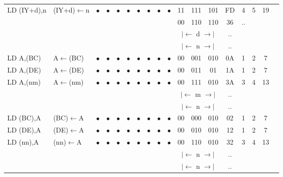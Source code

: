 \documentclass[oneside,a4paper]{book}
\begin{document}
{\begin{tabular}{llcccccccccccccccl}
		LD (IY+d),n\instrt & 
			(IY+d)$\leftarrow$n & 
			$\bullet$ & 
				$\bullet$ & 
				$\bullet$ & 
				$\bullet$ & 
				$\bullet$ & 
				$\bullet$ & 
				$\bullet$ & 
				$\bullet$ & 
			11 & 111 & 101 & 
			FD & 4 & 
			5 & 19 & \\
		\multicolumn{10}{c}{} & 00 & 110 & 110 & 36 & .. & & & \\
		\multicolumn{10}{c}{} & \multicolumn{3}{c}{$|\longleftarrow$ d $\longrightarrow|$} & .. & & & \\
		\multicolumn{10}{c}{} & \multicolumn{3}{c}{$|\longleftarrow$ n $\longrightarrow|$} & .. & & & \instrb \\

		LD A,(BC)\instrt & 
			A$\leftarrow$(BC) & 
			$\bullet$ & 
				$\bullet$ & 
				$\bullet$ & 
				$\bullet$ & 
				$\bullet$ & 
				$\bullet$ & 
				$\bullet$ & 
				$\bullet$ & 
			00 & 001 & 010 & 
			0A & 1 & 
			2 & 7 & \instrb \\

		LD A,(DE)\instrt & 
			A$\leftarrow$(DE) & 
			$\bullet$ & 
				$\bullet$ & 
				$\bullet$ & 
				$\bullet$ & 
				$\bullet$ & 
				$\bullet$ & 
				$\bullet$ & 
				$\bullet$ & 
			00 & 011 & 01 & 
			1A & 1 & 
			2 & 7 & \instrb \\

		LD A,(nm)\instrt & 
			A$\leftarrow$(nm) & 
			$\bullet$ & 
				$\bullet$ & 
				$\bullet$ & 
				$\bullet$ & 
				$\bullet$ & 
				$\bullet$ & 
				$\bullet$ & 
				$\bullet$ & 
			00 & 111 & 010 & 
			3A & 3 & 
			4 & 13 & \\
		\multicolumn{10}{c}{} & \multicolumn{3}{c}{$|\longleftarrow$ m $\longrightarrow|$} & .. & & & \\
		\multicolumn{10}{c}{} & \multicolumn{3}{c}{$|\longleftarrow$ n $\longrightarrow|$} & .. & & & \instrb \\
		
		LD (BC),A\instrt & 
			(BC)$\leftarrow$A & 
			$\bullet$ & 
				$\bullet$ & 
				$\bullet$ & 
				$\bullet$ & 
				$\bullet$ &
				$\bullet$ & 
				$\bullet$ & 
				$\bullet$ & 
			00 & 000 & 010 & 
			02 & 1 & 
			2 & 7 & \instrb \\

		LD (DE),A\instrt & 
			(DE)$\leftarrow$A & 
			$\bullet$ & 
				$\bullet$ & 
				$\bullet$ & 
				$\bullet$ & 
				$\bullet$ & 
				$\bullet$ & 
				$\bullet$ & 
				$\bullet$ & 
			00 & 010 & 010 & 
			12 & 1 & 
			2 & 7 & \instrb \\

		LD (nn),A\instrt & 
			(nn)$\leftarrow$A & 
			$\bullet$ & 
				$\bullet$ & 
				$\bullet$ & 
				$\bullet$ & 
				$\bullet$ & 
				$\bullet$ & 
				$\bullet$ & 
				$\bullet$ & 
			00 & 110 & 010 & 
			32 & 3 & 
			4 & 13 & \\
		\multicolumn{10}{c}{} & \multicolumn{3}{c}{$|\longleftarrow$ n $\longrightarrow|$} & .. & & & \\
		\multicolumn{10}{c}{} & \multicolumn{3}{c}{$|\longleftarrow$ n $\longrightarrow|$} & .. & & & \instrb \\


\end{tabular}}
\end{document}
